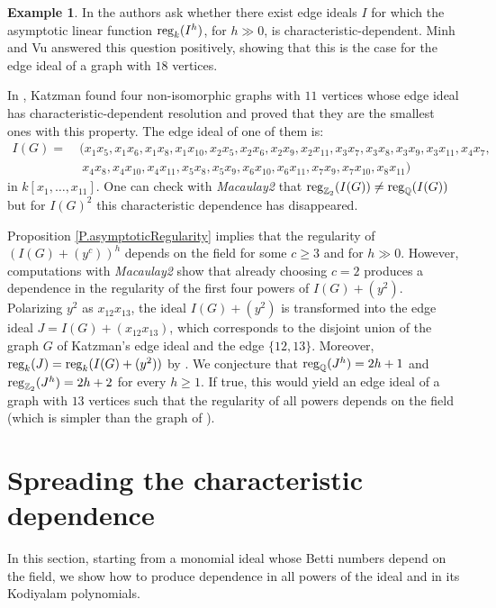\documentclass[11pt,oneside]{amsart}
\theoremstyle{plain}
\theoremstyle{definition}
\newtheorem{example}[theorem]{Example}
\newcommand{\reg}{{\rm reg}}
\newcommand{\Q}{\mathbb{Q}}
\newcommand{\Z}{\mathbb{Z}}
\begin{document}
\begin{example}\label{E.KatzmanEdgeIdeal}
In \cite[Problem 7.10]{BBH19} the authors ask whether there exist edge ideals $I$ for which the asymptotic linear function $\reg_k(I^h)$, for $h \gg 0$, is characteristic-dependent. Minh and Vu \cite[Remark 5.3]{MV21} answered this question positively, showing that this is the case for the edge ideal of a graph with $18$ vertices.

In \cite[Appendix A]{K06}, Katzman found four non-isomorphic graphs with $11$ vertices whose edge ideal has characteristic-dependent resolution and proved that they are the smallest ones with this property. The edge ideal of one of them is:
\begin{align*}%
I(G) = & \ (x_1x_5,x_1x_6,x_1x_8,x_1x_{10},x_2x_5,x_2x_6,x_2x_9,x_2x_{11},x_3x_7,x_3x_8,x_3x_9,x_3x_{11},x_4x_7,\\
\nonumber & \ \ x_4x_8,x_4x_{10},x_4x_{11}, x_5x_8,x_5x_9,x_6x_{10},x_6x_{11},x_7x_9,x_7x_{10},x_8x_{11})
\end{align*}
in $k[x_1,\dots,x_{11}]$. One can check with \textit{Macaulay2} that $\reg_{\Z_2}(I(G)) \neq \reg_{\Q}(I(G))$ but for $I(G)^2$ this
characteristic dependence has disappeared.

Proposition \ref{P.asymptoticRegularity} implies that the regularity of $(I(G) + (y^c))^h$ depends on the field for some $c \geq 3$ and for $h \gg 0$. However, computations with \textit{Macaulay2} show that already choosing $c=2$ produces a dependence in the regularity of the first four powers of $I(G) + (y^2)$. Polarizing $y^2$ as $x_{12}x_{13}$, the ideal $I(G) + (y^2)$ is transformed into the edge ideal $J = I(G) + (x_{12}x_{13})$, which corresponds to the disjoint union of the graph $G$ of Katzman's edge ideal and the edge $\{12,13\}$. Moreover, $\reg_k(J) = \reg_k(I(G) + (y^2))$ by \cite[Corollary 1.6.3 (c)]{HH11}.
We conjecture that $\reg_{\Q}(J^h) = 2h+1$ and $\reg_{\Z_2}(J^h) = 2h+2$ for every $h \geq 1$. If true, this would yield an edge ideal of a graph with $13$ vertices such that the regularity of all powers depends on the field (which is simpler than the graph of \cite[Remark 5.4]{MV21}).
\end{example}


\section{Spreading the characteristic dependence}

In this section, starting from a monomial ideal whose Betti numbers depend on the field, we show how to produce dependence in all powers of the ideal and in its Kodiyalam polynomials.
\end{document}
